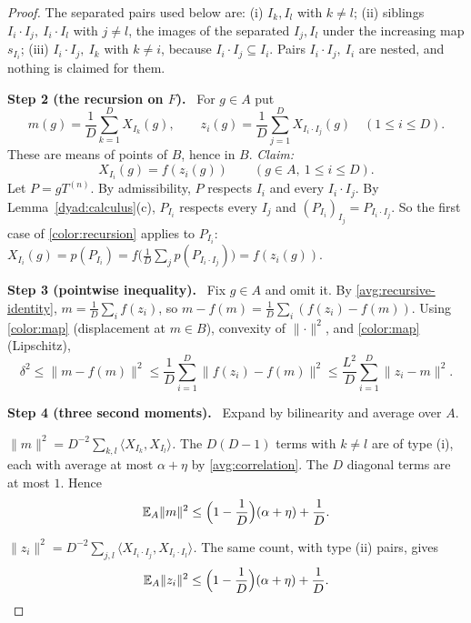 \documentclass[11pt]{article}
\newcommand{\norm}[1]{\lVert #1\rVert}
\newcommand{\ip}[2]{\langle #1,#2\rangle}
\newcommand{\step}[1]{\par\smallskip\noindent\textbf{Step #1.}\ }
\theoremstyle{definition}
\numberwithin{equation}{section}
\begin{document}
\begin{proof}
The separated pairs used below are: (i) $I_k,I_l$ with $k\ne l$; (ii)
siblings $I_i\cdot I_j,\ I_i\cdot I_l$ with $j\ne l$, the images of the
separated $I_j,I_l$ under the increasing map $s_{I_i}$; (iii)
$I_i\cdot I_j,\ I_k$ with $k\ne i$, because $I_i\cdot I_j\subseteq I_i$.
Pairs $I_i\cdot I_j,\ I_i$ are nested, and nothing is claimed for them.

\step{2 (the recursion on $F$)} For $g\in A$ put
\[
  m(g)=\frac1D\sum_{k=1}^D X_{I_k}(g),\qquad
  z_i(g)=\frac1D\sum_{j=1}^D X_{I_i\cdot I_j}(g)\quad(1\le i\le D).
\]
These are means of points of $B$, hence in $B$. \emph{Claim:}
\begin{equation}\label{avg:recursive-identity}
  X_{I_i}(g)=f(z_i(g))\qquad(g\in A,\ 1\le i\le D).
\end{equation}
Let $P=gT^{(n)}$. By admissibility, $P$ respects $I_i$ and every
$I_i\cdot I_j$. By Lemma~\ref{dyad:calculus}(c), $P_{I_i}$ respects every
$I_j$ and $(P_{I_i})_{I_j}=P_{I_i\cdot I_j}$. So the first case of
\eqref{color:recursion} applies to $P_{I_i}$:
$X_{I_i}(g)=p(P_{I_i})=f\bigl(\frac1D\sum_jp(P_{I_i\cdot I_j})\bigr)
=f(z_i(g))$.

\step{3 (pointwise inequality)} Fix $g\in A$ and omit it. By
\eqref{avg:recursive-identity}, $m=\frac1D\sum_if(z_i)$, so
$m-f(m)=\frac1D\sum_i(f(z_i)-f(m))$. Using \eqref{color:map} (displacement
at $m\in B$), convexity of $\norm{\cdot}^2$, and \eqref{color:map}
(Lipschitz),
\begin{equation}\label{avg:displacement}
  \delta^2\le\norm{m-f(m)}^2
  \le\frac1D\sum_{i=1}^D\norm{f(z_i)-f(m)}^2
  \le\frac{L^2}{D}\sum_{i=1}^D\norm{z_i-m}^2 .
\end{equation}

\step{4 (three second moments)} Expand by bilinearity and average over $A$.

\emph{$\norm{m}^2=D^{-2}\sum_{k,l}\ip{X_{I_k}}{X_{I_l}}$.} The $D(D-1)$
terms with $k\ne l$ are of type (i), each with average at most $\alpha+\eta$
by \eqref{avg:correlation}. The $D$ diagonal terms are at most $1$. Hence
\begin{equation}\label{avg:parent-bound}
  \mathbb E_A\norm{m}^2\le\Bigl(1-\frac1D\Bigr)(\alpha+\eta)+\frac1D .
\end{equation}

\emph{$\norm{z_i}^2
=D^{-2}\sum_{j,l}\ip{X_{I_i\cdot I_j}}{X_{I_i\cdot I_l}}$.} The same
count, with type (ii) pairs, gives
\begin{equation}\label{avg:child-bound}
  \mathbb E_A\norm{z_i}^2\le\Bigl(1-\frac1D\Bigr)(\alpha+\eta)+\frac1D .
\end{equation}


\end{proof}
\end{document}
